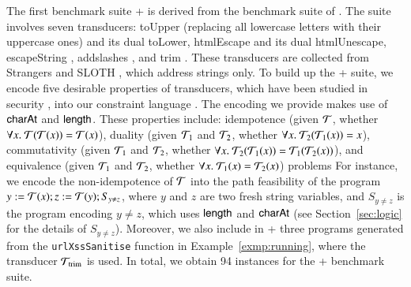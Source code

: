 The first benchmark suite {\transducerbench+} is derived from the {\transducerbench} benchmark suite of {\ostrich} \cite{CHL+19}.  The {\transducerbench} suite involves seven transducers: toUpper (replacing all lowercase letters with their uppercase ones) and its dual toLower, htmlEscape \cite{htmlEscape} and its dual htmlUnescape, escapeString \cite{escapeString}, addslashes \cite{addslashes}, and trim \cite{trim}. These transducers are collected from Strangers \cite{YABI14} and SLOTH \cite{HJLRV18}, which address strings only. To build up the {\transducerbench+} suite, %
we encode five desirable properties of transducers, which have been studied in security \cite{BEK}, into our constraint language {\slint}. The encoding we provide makes use of $\mathsf{charAt}$ and $\mathsf{length}$. These properties include: idempotence (given $\mathcal{T}$, whether $\forall x.\ \mathcal{T}(\mathcal{T}(x)) = \mathcal{T}(x)$), duality (given $\mathcal{T}_1$ and $\mathcal{T}_2$, whether $\forall x.\ \mathcal{T}_2(\mathcal{T}_1(x)) = x$), commutativity (given $\mathcal{T}_1$ and $\mathcal{T}_2$, whether $\forall x.\ \mathcal{T}_2(\mathcal{T}_1(x)) = \mathcal{T}_1(\mathcal{T}_2(x))$), and equivalence (given $\mathcal{T}_1$ and $\mathcal{T}_2$, whether $\forall x.\ \mathcal{T}_1(x) = \mathcal{T}_2(x)$) problems
%
For instance, we encode the non-idempotence of $\mathcal{T}$ into the path feasibility of the {\slint} program $y:=\mathcal{T}(x); z:=\mathcal{T}(y); S_{y \neq z}$, where $y$ and $z$ are two fresh string variables, and $S_{y \neq z}$ is the {\slint} program encoding $y \neq z$, which uses $\mathsf{length}$ and $\mathsf{charAt}$ (see Section~\ref{sec:logic} for the details of $S_{y \neq z}$). Moreover, we also include in {\transducerbench+} three {\slint} programs generated from the {\tt urlXssSanitise} function in Example~\ref{exmp:running}, where the transducer $\mathcal{T}_{\rm trim}$ is used. In total, we obtain 94 instances for the {\transducerbench+} benchmark suite. 
%
